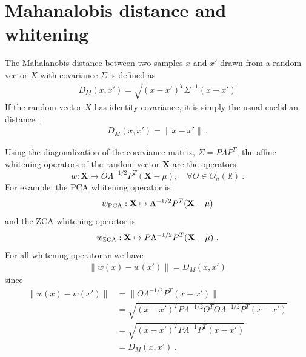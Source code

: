 \documentclass{article}
\begin{document}

{}

\newpage

\appendix

\section{Mahanalobis distance and whitening}

The Mahalanobis distance \citep{chandra1936generalised, mclachlan1999mahalanobis} between two samples $x$ and $x'$ drawn from a random vector $X$ with covariance $\Sigma$ is defined as  
\begin{align*} D_M (x, x' ) =  \sqrt{ (x - x')^T \Sigma^{-1} (x - x')} \end{align*}
If the random vector $X$ has identity covariance, it is simply the usual euclidian distance : 
\begin{align*} D_M (x, x' ) =  \| x - x' \| \ .\end{align*}

Using the diagonalization of the coraviance matrix,  $\Sigma = P\Lambda P^T$, the affine whitening operators of the random vector $\mathbf{X}$ are the operators 
\begin{equation}
\label{whitening}
     w : \mathbf{X} \mapsto O \Lambda^{-1/2} P^T (\mathbf{X} - \mu), \quad \forall O \in  O_n (\mathbb{R}) \ .
\end{equation}
For example, the PCA whitening operator is 
\begin{equation*}
     w_{\rm PCA} : \mathbf{X} \mapsto \Lambda^{-1/2} P^T (\mathbf{X} - \mu)
\end{equation*}
and the ZCA whitening operator is 
\begin{equation*}
     w_{\rm ZCA} : \mathbf{X} \mapsto P \Lambda^{-1/2} P^T (\mathbf{X} - \mu) \ .
\end{equation*}
For all whitening operator $w$ we have
\begin{align*}
\|w(x) - w(x')\| = D_M(x, x')
\end{align*}
since
\begin{align*}
  \|w(x) - w(x')\|
    &= \| O \Lambda^{-1/2} P^T ( x - x') \|\\
    &= \sqrt{(x - x')^T P \Lambda^{-1/2} O^T O \Lambda^{-1/2} P^T (x - x') }\\
    &=  \sqrt{ (x - x')^T P \Lambda^{-1} P^T (x - x')} \\
    &= D_M(x, x') \ .
\end{align*}
\end{document}
